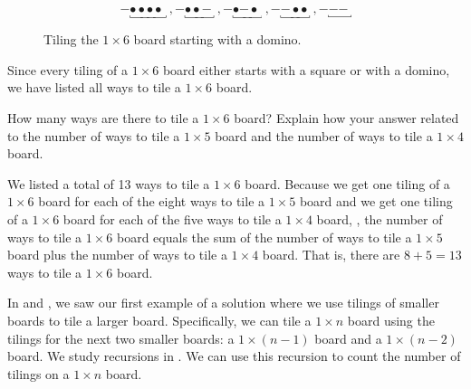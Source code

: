 \begin{exam}
\begin{actpart}
\begin{soln}
                \begin{figure}[hbtp]
                    \centering
                    $$\boldsymbol{-} \underbracket{\bullet \bullet \bullet \bullet~}~,
                    \boldsymbol{-} \underbracket{\bullet \bullet \boldsymbol{-}~}~,
                    \boldsymbol{-} \underbracket{\bullet \boldsymbol{-} \bullet~}~,
                    \boldsymbol{-} \underbracket{\boldsymbol{-} \bullet \bullet~}~,
                    \boldsymbol{-} \underbracket{\boldsymbol{-} \boldsymbol{-}~}
                    $$
                    \caption{Tiling the $1 \times 6$ board starting with a domino.}
                    \label{fig_sq_dom6_start2}
                \end{figure}
                Since every tiling of a $1 \times 6$ board either starts with a square or with a domino, we have listed all ways to tile a $1 \times 6$ board.
            \end{soln}
        \item How many ways are there to tile a $1 \times 6$ board?  Explain how your answer related to the number of ways to tile a $1 \times 5$ board and the number of ways to tile a $1 \times 4$ board.
            \begin{soln}
                We listed a total of 13 ways to tile a $1 \times 6$ board. Because we get one tiling of a $1 \times 6$ board for each of the eight ways to tile a $1 \times 5$ board and we get one tiling of a $1 \times 6$ board for each of the five ways to tile a $1 \times 4$ board, , the number of ways to tile a $1 \times 6$ board equals the sum of the number of ways to tile a $1 \times 5$ board plus the number of ways to tile a $1 \times 4$ board. That is, there are $8+5=13$ ways to tile a $1 \times 6$ board.
            \end{soln}
        \end{actpart}
\end{exam}

In  and , we saw our first example of a  solution where we use tilings of smaller boards to tile a larger board.  Specifically, we can tile a $1 \times n$ board using the tilings for the next two smaller boards: a $1 \times (n-1)$ board and a $1 \times (n-2)$ board. We study recursions in  \chrecind.  We can use this recursion to count the number of tilings on a $1 \times n$ board. 

